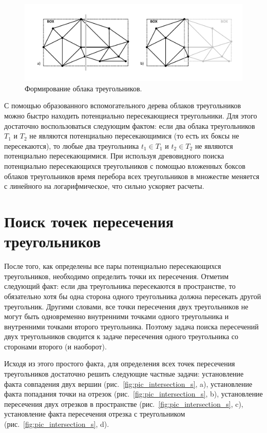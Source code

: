 \documentclass[
11pt,%
tightenlines,%
twoside,%
onecolumn,%
nofloats,%
nobibnotes,%
nofootinbib,%
superscriptaddress,%
noshowpacs,%
centertags]%
{revtex4}
\begin{document}
\begin{figure}[h]
\includegraphics[width=1.0\textwidth]{pics/pic_triangles_cloud_s.pdf}
\caption{Формирование облака треугольников.}\label{fig:pic_triangles_cloud_s}
\end{figure}

С помощью образованного вспомогательного дерева облаков треугольников можно быстро находить потенциально пересекающиеся треугольники.
Для этого достаточно воспользоваться следующим фактом: если два облака треугольников $T_1$ и $T_2$ не являются потенциально пересекающимися (то есть их боксы не пересекаются), то любые два треугольника $t_1 \in T_1$ и $t_2 \in T_2$ не являются потенциально пересекающимися.
При используя древовидного поиска потенциально пересекающихся треугольников с помощью вложенных боксов облаков треугольников время перебора всех треугольников в множестве меняется с линейного на логарифмическое, что сильно ускоряет расчеты.

\section{Поиск точек пересечения треугольников}

После того, как определены все пары потенциально пересекающихся треугольников, необходимо определить точки их пересечения.
Отметим следующий факт: если два треугольника пересекаются в пространстве, то обязательно хотя бы одна сторона одного треугольника должна пересекать другой треугольник.
Другими словами, все точки пересечения двух треугольников не могут быть одновременно внутренними точками одного треугольника и внутренними точками второго треугольника.
Поэтому задача поиска пересечений двух треугольников сводится к задаче пересечения одного треугольника со сторонами второго (и наоборот).

Исходя из этого простого факта, для определения всех точек пересечения треугольников достаточно решить следующие частные задачи: установление факта совпадения двух вершин (рис.~\ref{fig:pic_intersection_s}, a), установление факта попадания точки на отрезок (рис.~\ref{fig:pic_intersection_s}, b), установление пересечения двух отрезков в пространстве (рис.~\ref{fig:pic_intersection_s}, c), установление факта пересечения отрезка с треугольником (рис.~\ref{fig:pic_intersection_s}, d). 
\end{document}

